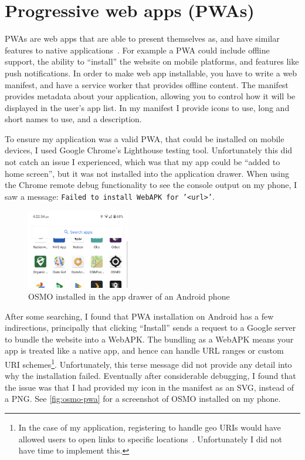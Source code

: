 \documentclass[hyphens]{final_report}
\begin{document}
\section{Progressive web apps (PWAs)}

PWAs are web apps that are able to present themselves as, and have similar features to native applications~\cite{mdn-pwas}. For example a PWA could include offline support, the ability to ``install'' the website on mobile platforms, and features like push notifications. In order to make web app installable, you have to write a web manifest, and have a service worker that provides offline content. The manifest provides metadata about your application, allowing you to control how it will be displayed in the user's app list. In my manifest I provide icons to use, long and short names to use, and a description.

To ensure my application was a valid PWA, that could be installed on mobile devices, I used Google Chrome's Lighthouse testing tool. Unfortunately this did not catch an issue I experienced, which was that my app could be ``added to home screen'', but it was not installed into the application drawer. When using the Chrome remote debug functionality to see the console output on my phone, I saw a message: \texttt{Failed to install WebAPK for '<url>'}. 

\begin{figure}[ht]
    \centering
    \includegraphics[width=0.4\textwidth]{images/osmo-pwa.png}
    \caption{OSMO installed in the app drawer of an Android phone}\label{fig:osmo-pwa}
\end{figure}

After some searching, I found that PWA installation on Android has a few indirections, principally that clicking ``Install'' sends a request to a Google server to bundle the website into a WebAPK\@. The bundling as a WebAPK means your app is treated like a native app, and hence can handle URL ranges or custom URI schemes\footnote{In the case of my application, registering to handle geo URIs would have allowed users to open links to specific locations~\cite{geo-uri-rfc}. Unfortunately I did not have time to implement this.}. Unfortunately, this terse message did not provide any detail into why the installation failed. Eventually after considerable debugging, I found that the issue was that I had provided my icon in the manifest as an SVG, instead of a PNG\@. See \autoref{fig:osmo-pwa} for a screenshot of OSMO installed on my phone.
\end{document}
